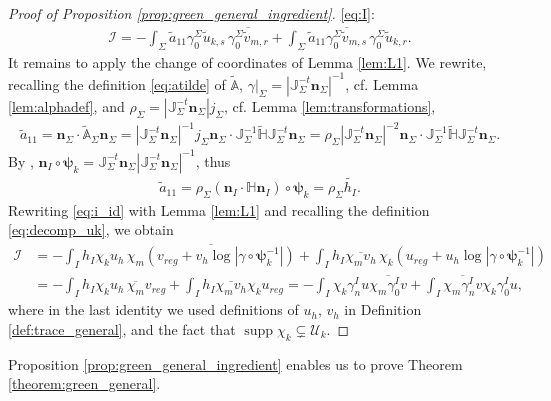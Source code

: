 \documentclass[report]{elsarticle}
\numberwithin{theorem}{section}
\newcommand{\bpsi}{\boldsymbol{\psi}}
\renewcommand{\vec}[1]{\mathbf{#1}}
\begin{document}
\begin{proof}[Proof of Proposition \ref{prop:green_general_ingredient}]
\eqref{eq:I}: 
\begin{align}
	\label{eq:i_id}
	\mathcal{I}=-\int_{\Sigma}\widetilde{a}_{11}\gamma_0^{\Sigma}\widetilde{u}_{k,s}\, \overline{\gamma_0^{\Sigma}\widetilde{v}_{m,r}}+\int_{\Sigma}\widetilde{a}_{11}\overline{\gamma_0^{\Sigma}\widetilde{v}_{m,s}}\, {\gamma_0^{\Sigma}\widetilde{u}_{k,r}}.
\end{align}
It remains to apply the change of coordinates of Lemma \ref{lem:L1}. We rewrite, recalling the definition \eqref{eq:atilde} of $\widetilde{\mathbb{A}}$, $\left. \gamma\right|_{\Sigma}=|\mathbb{J}^{-t}_{\Sigma}\vec{n}_{\Sigma}|^{-1}$, cf. Lemma \ref{lem:alphadef}, and $\rho_{\Sigma}=|\mathbb{J}^{-t}_{\Sigma}\vec{n}_{\Sigma}|j_{\Sigma}$, cf. Lemma \ref{lem:transformations},
\begin{align*}
\widetilde{a}_{11}=\vec{n}_{\Sigma}\cdot\widetilde{\mathbb{A}}_{\Sigma}\vec{n}_{\Sigma}=|\mathbb{J}_{\Sigma}^{-t}\vec{n}_{\Sigma}|^{-1}j_{\Sigma}\vec{n}_{\Sigma}\cdot \mathbb{J}^{-1}_{\Sigma}\widetilde{\mathbb{H}}\mathbb{J}^{-t}_{\Sigma}\vec{n}_{\Sigma}=\rho_{\Sigma}|\mathbb{J}_{\Sigma}^{-t}\vec{n}_{\Sigma}|^{-2}\vec{n}_{\Sigma}\cdot \mathbb{J}^{-1}_{\Sigma}\widetilde{\mathbb{H}}\mathbb{J}^{-t}_{\Sigma}\vec{n}_{\Sigma}.
\end{align*}
By \cite[(2.1.94)]{boffi}, $\vec{n}_I\circ \bpsi_k=\mathbb{J}^{-t}_{\Sigma}\vec{n}_{\Sigma}|\mathbb{J}^{-t}_{\Sigma}\vec{n}_{\Sigma}|^{-1}$, thus 
\begin{align*}
\widetilde{a}_{11}=\rho_{\Sigma}(\vec{n}_I\cdot \mathbb{H}\vec{n}_I)\circ {\bpsi}_k=\rho_{\Sigma}\widetilde{h_I}.
\end{align*}
Rewriting \eqref{eq:i_id} with Lemma \ref{lem:L1} and recalling the definition \eqref{eq:decomp_uk}, we obtain 
\begin{align*}
	\mathcal{I}&=-\int_{I}h_I \chi_k u_h\, \overline{\chi_m(v_{reg}+v_h\log|\gamma\circ{\bpsi}_k^{-1}|)}+\int_{I}h_I \overline{\chi_m v_h}\, {\chi_k(u_{reg}+u_h\log|\gamma\circ{\bpsi}_k^{-1}|)}\\
	&=-\int_{I}h_I\chi_k u_h\, {\overline{\chi_m}v_{reg}}+\int_{I}h_I\overline{\chi_m v_h}\chi_k u_{reg}	=-\int_{I}\chi_k\gamma_n^I u\overline{\chi_m \gamma_0^I v}+\int_{I}\overline{\chi_m\gamma_n^I v}{\chi_k \gamma_0^I u},
\end{align*} 
where in the last identity we used definitions of $u_h,\,v_h$ in Definition \ref{def:trace_general}, and the fact that $\operatorname{supp}\chi_k\subsetneq \mathcal{U}_k$. 
\end{proof}
Proposition  \ref{prop:green_general_ingredient} enables us to prove Theorem \ref{theorem:green_general}. 
\end{document}
